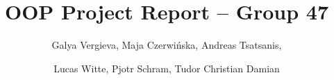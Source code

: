 \documentclass[sigconf]{acmart}
\title{OOP Project Report -- Group 47}
\author{Galya Vergieva, Maja Czerwińska, Andreas Tsatsanis,}
\author{Lucas Witte, Pjotr Schram, Tudor Christian Damian}
\begin{document}
\begin{abstract}

\end{abstract}

\maketitle









% 



\end{document}
